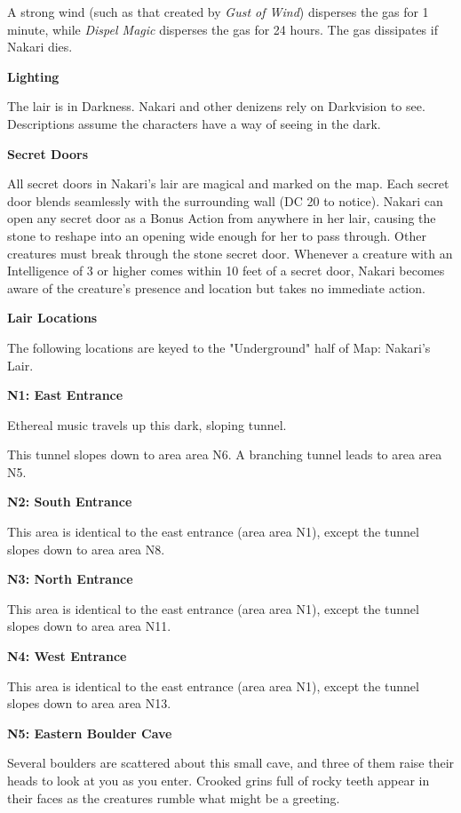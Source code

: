 \documentclass[letterpaper, 11pt, twocolumn]{dndbook}
\begin{document}
A strong wind (such as that created by \textit{Gust of Wind}) disperses the gas for 1 minute, while \textit{Dispel Magic} disperses the gas for 24 hours. The gas dissipates if Nakari dies.

\textbf{Lighting}

The lair is in Darkness. Nakari and other denizens rely on Darkvision to see. Descriptions assume the characters have a way of seeing in the dark.

\textbf{Secret Doors}

All secret doors in Nakari's lair are magical and marked on the map. Each secret door blends seamlessly with the surrounding wall (DC 20 to notice). Nakari can open any secret door as a Bonus Action from anywhere in her lair, causing the stone to reshape into an opening wide enough for her to pass through. Other creatures must break through the stone secret door. Whenever a creature with an Intelligence of 3 or higher comes within 10 feet of a secret door, Nakari becomes aware of the creature's presence and location but takes no immediate action.

\textbf{Lair Locations}



The following locations are keyed to the "Underground" half of Map: Nakari's Lair.

\textbf{N1: East Entrance}

\begin{DndReadAloud}
Ethereal music travels up this dark, sloping tunnel.
\end{DndReadAloud}

This tunnel slopes down to area area N6. A branching tunnel leads to area area N5.

\textbf{N2: South Entrance}

This area is identical to the east entrance (area area N1), except the tunnel slopes down to area area N8.

\textbf{N3: North Entrance}

This area is identical to the east entrance (area area N1), except the tunnel slopes down to area area N11.

\textbf{N4: West Entrance}

This area is identical to the east entrance (area area N1), except the tunnel slopes down to area area N13.

\textbf{N5: Eastern Boulder Cave}

\begin{DndReadAloud}
Several boulders are scattered about this small cave, and three of them raise their heads to look at you as you enter. Crooked grins full of rocky teeth appear in their faces as the creatures rumble what might be a greeting.
\end{DndReadAloud}
\end{document}
